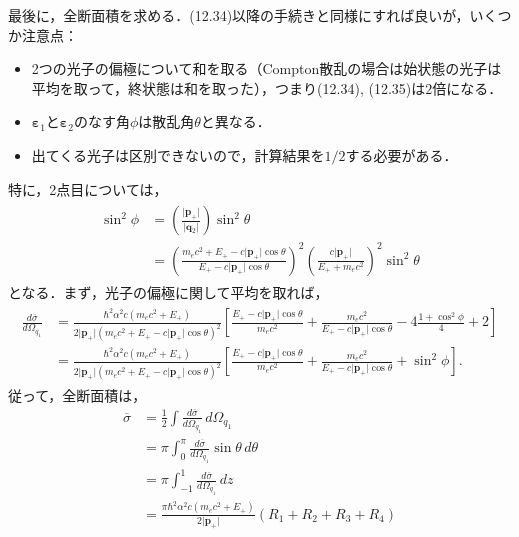 最後に，全断面積を求める．(12.34)以降の手続きと同様にすれば良いが，いくつか注意点：
\begin{itemize}
  \item 2つの光子の偏極について和を取る（Compton散乱の場合は始状態の光子は平均を取って，終状態は和を取った），つまり(12.34), (12.35)は$2$倍になる．
  \item $\boldsymbol{\varepsilon}_1$と$\boldsymbol{\varepsilon}_2$のなす角$\phi$は散乱角$\theta$と異なる．
  \item 出てくる光子は区別できないので，計算結果を$1/2$する必要がある．
\end{itemize}
特に，2点目については，
\begin{align}
  \begin{split}
    \sin^2\phi &= \left(\frac{\lvert\boldsymbol{p}_+\rvert}{\lvert\boldsymbol{q}_2\rvert}\right)\sin^2\theta \\
    &= \left(\frac{m_ec^2 + E_+ - c\lvert\boldsymbol{p}_+\rvert\cos\theta}{E_+ - c\lvert\boldsymbol{p}_+\rvert\cos\theta}\right)^2 \left(\frac{c\lvert\boldsymbol{p}_+\rvert}{E_+ + m_ec^2}\right)^2 \sin^2\theta
  \end{split}
\end{align}
となる．まず，光子の偏極に関して平均を取れば，
\begin{align}
  \begin{split}
    \frac{d\overline\sigma}{d\Omega_{q_1}} &= \frac{\hbar^2\alpha^2c(m_ec^2 + E_+)}{2\lvert\boldsymbol{p}_+\rvert(m_ec^2 + E_+ - c\lvert\boldsymbol{p}_+\rvert\cos\theta)^2}\left[  \frac{E_+ - c\lvert\boldsymbol{p}_+\rvert\cos\theta}{m_ec^2} + \frac{m_ec^2}{E_+ - c\lvert\boldsymbol{p}_+\rvert\cos\theta} - 4\frac{1+\cos^2\phi}{4} + 2 \right]\\
    &= \frac{\hbar^2\alpha^2c(m_ec^2 + E_+)}{2\lvert\boldsymbol{p}_+\rvert(m_ec^2 + E_+ - c\lvert\boldsymbol{p}_+\rvert\cos\theta)^2}\left[  \frac{E_+ - c\lvert\boldsymbol{p}_+\rvert\cos\theta}{m_ec^2} + \frac{m_ec^2}{E_+ - c\lvert\boldsymbol{p}_+\rvert\cos\theta} + \sin^2\phi \right].
  \end{split}
\end{align}
従って，全断面積は，
\begin{align}
  \overline{\sigma} &= \frac{1}{2}\int \frac{d\overline\sigma}{d\Omega_{q_1}}\,d\Omega_{q_1} \\
  &= \pi\int_0^\pi\frac{d\overline\sigma}{d\Omega_{q_1}}\sin\theta\,d\theta \\
  &= \pi\int_{-1}^1\frac{d\overline\sigma}{d\Omega_{q_1}}\,dz \\
  &= \frac{\pi\hbar^2\alpha^2c(m_ec^2 + E_+)}{2\lvert\boldsymbol{p}_+\rvert}(R_1 + R_2 + R_3 + R_4)\label{cross_section}
\end{align}
